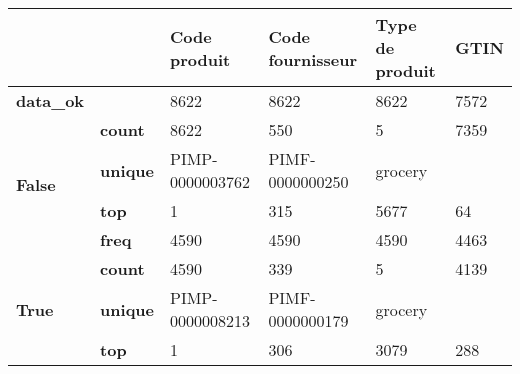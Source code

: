 \begin{tabularx}{\linewidth}{lXXXXX}
\toprule
      &      &     Code produit & Code fournisseur & Type de produit &  GTIN \\
\midrule
\textbf{data\_ok} & {} &             8622 &             8622 &            8622 &  7572 \\
\multirow{4}{*}{\textbf{False}} & \textbf{count} &             8622 &              550 &               5 &  7359 \\
      & \textbf{unique} &  PIMP-0000003762 &  PIMF-0000000250 &         grocery &       \\
      & \textbf{top} &                1 &              315 &            5677 &    64 \\
      & \textbf{freq} &             4590 &             4590 &            4590 &  4463 \\
\cline{1-6}
\multirow{3}{*}{\textbf{True }} & \textbf{count} &             4590 &              339 &               5 &  4139 \\
      & \textbf{unique} &  PIMP-0000008213 &  PIMF-0000000179 &         grocery &       \\
      & \textbf{top} &                1 &              306 &            3079 &   288 \\
\bottomrule
\end{tabularx}
